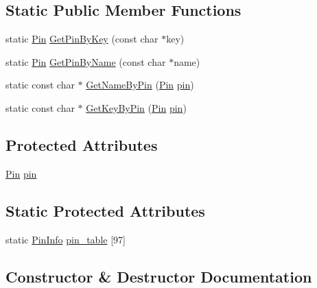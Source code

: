 \subsection*{Static Public Member Functions}
\begin{DoxyCompactItemize}
\item 
static \hyperlink{namespacecubesat_af928ed4b56ef60d75953a91225b37a00}{Pin} \hyperlink{classcubesat_1_1GPIO_a0681d886f2a688683575716119e4af7a}{Get\+Pin\+By\+Key} (const char $\ast$key)
\item 
static \hyperlink{namespacecubesat_af928ed4b56ef60d75953a91225b37a00}{Pin} \hyperlink{classcubesat_1_1GPIO_afaa49b223ab1f338d279938a826eba2d}{Get\+Pin\+By\+Name} (const char $\ast$name)
\item 
static const char $\ast$ \hyperlink{classcubesat_1_1GPIO_a676a794c2d2f2f636c7a23f71613e48e}{Get\+Name\+By\+Pin} (\hyperlink{namespacecubesat_af928ed4b56ef60d75953a91225b37a00}{Pin} \hyperlink{classcubesat_1_1GPIO_af3e219ff169f027626becf1797a02c50}{pin})
\item 
static const char $\ast$ \hyperlink{classcubesat_1_1GPIO_a3df734f0471cf7e7038c186c80b14995}{Get\+Key\+By\+Pin} (\hyperlink{namespacecubesat_af928ed4b56ef60d75953a91225b37a00}{Pin} \hyperlink{classcubesat_1_1GPIO_af3e219ff169f027626becf1797a02c50}{pin})
\end{DoxyCompactItemize}
\subsection*{Protected Attributes}
\begin{DoxyCompactItemize}
\item 
\hyperlink{namespacecubesat_af928ed4b56ef60d75953a91225b37a00}{Pin} \hyperlink{classcubesat_1_1GPIO_af3e219ff169f027626becf1797a02c50}{pin}
\end{DoxyCompactItemize}
\subsection*{Static Protected Attributes}
\begin{DoxyCompactItemize}
\item 
static \hyperlink{structcubesat_1_1PinInfo}{Pin\+Info} \hyperlink{classcubesat_1_1GPIO_a799d772718448f641fa2d4a3a18e60ac}{pin\+\_\+table} \mbox{[}97\mbox{]}
\end{DoxyCompactItemize}


\subsection{Constructor \& Destructor Documentation}
\mbox{\label{classcubesat_1_1GPIO_ae37721459fb7d477c095f60daaf3cd58}} 
